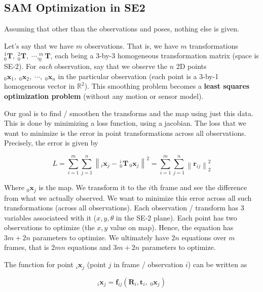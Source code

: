 
\subsection{SAM Optimization in SE2}

Assuming that other than the observations and poses, nothing else is given.

Let's say that we have $m$ observations. That is, we have $m$ transformations $^1_0\mathbf{T}, \; ^2_0\mathbf{T}, \; \cdots, ^m_0\mathbf{T}$, each being a 3-by-3 homogeneous transformation matrix (space is SE-2). For \textit{each} observation, say that we observe the $n$ 2D points $_0\mathbf{x}_1, \; _0\mathbf{x}_2, \; \cdots ,\; _0\mathbf{x}_n$ in the particular observation (each point is a 3-by-1 homogeneous vector in $\mathbb{R}^2$). This smoothing problem becomes a \textbf{least squares optimization problem} (without any motion or sensor model).

Our goal is to find / smoothen the transforms and the map using just this data. This is done by minimizing a loss function, using a jacobian. The loss that we want to minimize is the error in point transformations across all observations. Precisely, the error is given by

\begin{equation}
    L = \sum_{i=1}^m \sum_{j = 1}^n \left \| _i\mathbf{x}_j - \, ^i_0\mathbf{T} \, _0\mathbf{x}_j \right \|^2 = \sum_{i=1}^m \sum_{j = 1}^n \left \| \mathbf{r}_{ij} \right \|^2_2
\end{equation}

Where $_0\mathbf{x}_j$ is the map. We transform it to the $i$th frame and see the difference from what we actually observed. We want to minimize this error across all such transformations (across all observations). Each observation / transform has 3 variables associateed with it ($x, y, \theta$ in the SE-2 plane). Each point has two observations to optimize (the $x, y$ value on map). Hence, the equation has $3m+2n$ parameters to optimize. We ultimately have $2n$ equations over $m$ frames, that is $2mn$ equations and $3m+2n$ parameters to optimize.

The function for point $_i\mathbf{x}_j$ (point $j$ in frame / observation $i$) can be written as

\begin{equation}
    _i\mathbf{x}_j  = \mathbf{f}_{ij} \left ( \mathbf{R}_i, \mathbf{t}_i, \; _0\mathbf{x}_j \right )
\end{equation}


